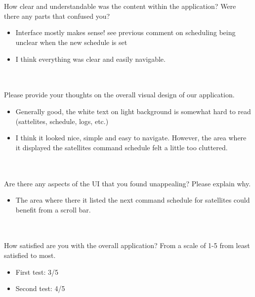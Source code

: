 \documentclass[12pt, titlepage]{article}
\begin{document}
\\ \\

How clear and understandable was the content within the application? Were there any parts that confused you?

\begin{itemize}
    \item Interface mostly makes sense! see previous comment on scheduling being unclear when the new schedule is set
    \item I think everything was clear and easily navigable.
\end{itemize}

\\ \\

Please provide your thoughts on the overall visual design of our application. 

\begin{itemize}
    \item Generally good, the white text on light background is somewhat hard to read (sattelites, schedule, logs, etc.)
    \item I think it looked nice, simple and easy to navigate. However, the area where it displayed the satellites command schedule felt a little too cluttered.
\end{itemize}

\\ \\

Are there any aspects of the UI that you found unappealing? Please explain why.

\begin{itemize}
    \item The area where there it listed the next command schedule for satellites could benefit from a scroll bar.
\end{itemize}

\\ \\

How satisfied are you with the overall application? From a scale of 1-5 from least satisfied to most.

\begin{itemize}
    \item First test: 3/5
    \item Second test: 4/5
\end{itemize}

\\ \\
\end{document}
